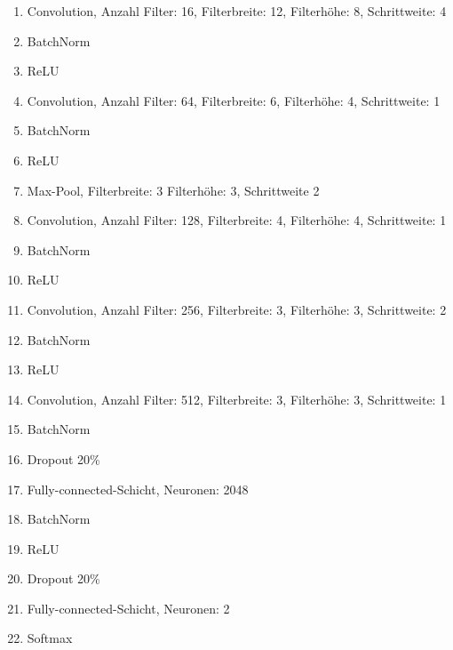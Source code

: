 \documentclass[12pt,a4paper]{report}
\begin{document}
\begin{enumerate}
    \setlength\itemsep{0cm}
    \setlength{\parskip}{0pt}
    \setlength{\parsep}{0pt}
    \item Convolution, Anzahl Filter: 16, Filterbreite: 12, Filterhöhe: 8, Schrittweite: 4
    \item BatchNorm
    \item ReLU
    \item Convolution, Anzahl Filter: 64, Filterbreite: 6, Filterhöhe: 4, Schrittweite: 1
    \item BatchNorm
    \item ReLU
    \item Max-Pool, Filterbreite: 3 Filterhöhe: 3, Schrittweite 2
    \item Convolution, Anzahl Filter: 128, Filterbreite: 4, Filterhöhe: 4, Schrittweite: 1
    \item BatchNorm
    \item ReLU
    \item Convolution, Anzahl Filter: 256, Filterbreite: 3, Filterhöhe: 3, Schrittweite: 2
    \item BatchNorm
    \item ReLU
    \item Convolution, Anzahl Filter: 512, Filterbreite: 3, Filterhöhe: 3, Schrittweite: 1
    \item BatchNorm
    \item Dropout 20\%
    \item Fully-connected-Schicht, Neuronen: 2048
    \item BatchNorm
    \item ReLU
    \item Dropout 20\%
    \item Fully-connected-Schicht, Neuronen: 2
    \item Softmax
\end{enumerate}
\end{document}
